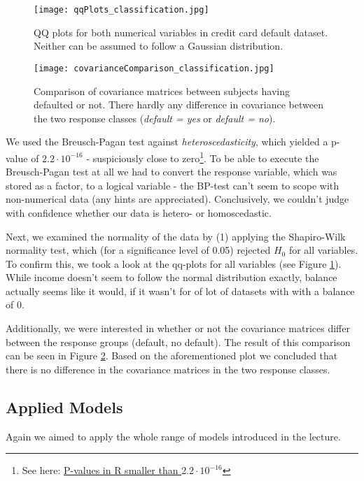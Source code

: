 \documentclass[a4paper]{article}
\begin{document}
\begin{figure}
	\centering
	\texttt{[image: qqPlots\_classification.jpg]}
	\caption{\label{fig:qqPlots_classification}QQ plots for both numerical variables in credit card default dataset. Neither can be assumed to follow a Gaussian distribution.}
\end{figure}

\begin{figure}
	\centering
	\texttt{[image: covarianceComparison\_classification.jpg]}
	\caption{\label{fig:covariance_classification}Comparison of covariance matrices between subjects having defaulted or not. There hardly any difference in covariance between the two response classes (\emph{default = yes} or \emph{default = no}).}
\end{figure}

We used the Breusch-Pagan test against \emph{heteroscedasticity}, which yielded a p-value of $2.2 \cdot 10^{-16}$ - suspiciously close to zero\footnote{See here: \href{http://stackoverflow.com/questions/6970705/why-cant-i-get-a-p-value-smaller-than-2-2e-16}{P-values in R smaller than $2.2\cdot10^{-16}$}}. To be able to execute the Breusch-Pagan test at all we had to convert the response variable, which was stored as a factor, to a logical variable - the BP-test can't seem to scope with non-numerical data (any hints are appreciated).
Conclusively, we couldn't judge with confidence whether our data is hetero- or homoscedastic.

Next, we examined the normality of the data by (1) applying the Shapiro-Wilk normality test, which (for a significance level of 0.05) rejected $H_0$ for all variables. To confirm this, we took a look at the qq-plots for all variables (see Figure \ref{fig:qqPlots_classification}). While income doesn't seem to follow the normal distribution exactly, balance actually seems like it would, if it wasn't for of lot of datasets with with a balance of 0.

Additionally, we were interested in whether or not the covariance matrices differ between the response groups (default, no default). The result of this comparison can be seen in Figure \ref{fig:covariance_classification}. Based on the aforementioned plot we concluded that there is no difference in the covariance matrices in the two response classes.


\subsection{Applied Models}
Again we aimed to apply the whole range of models introduced in the lecture.
\end{document}
